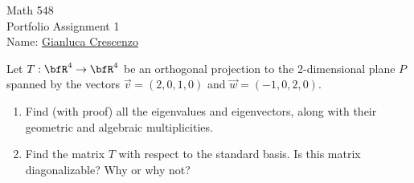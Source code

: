 \documentclass[10pt,twoside,openany]{memoir}
\begin{document}
\begin{center}
    {\Large Math 548 \\[0.1in]Portfolio Assignment 1}\\[.175in]
    {Name:} {\underline{Gianluca Crescenzo\hspace*{2in}}}\\[0.15in]
    \end{center}
    \vspace{4pt}
\begin{problem}[S24, P5]
Let $T:\bfR^4 \rightarrow \bfR^4$ be an orthogonal projection to the 2-dimensional plane $P$ spanned by the vectors $\vec{v} = (2,0,1,0)$ and $\vec{w} = (-1,0,2,0)$.
    \begin{enumerate}[label = (\alph*),itemsep=1pt,topsep=3pt]
        \item Find (with proof) all the eigenvalues and eigenvectors, along with their geometric and algebraic multiplicities.
        \item Find the matrix $T$ with respect to the standard basis. Is this matrix diagonalizable? Why or why not?
    \end{enumerate}
\end{problem}
\end{document}
